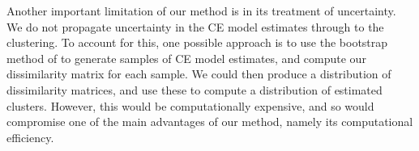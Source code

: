 \documentclass[12pt,compact]{article}
\DeclareMathOperator{\CE}{\mathrm{CE}}
\begin{document}
Another important limitation of our method is in its treatment of uncertainty.
We do not propagate uncertainty in the CE model estimates through to the clustering. 
To account for this, one possible approach is to use the bootstrap method of \citet{Heffernan2004} to generate samples of CE model estimates, and compute our dissimilarity matrix for each sample. 
We could then produce a distribution of dissimilarity matrices, and use these to compute a distribution of estimated clusters.
However, this would be computationally expensive, and so would compromise one of the main advantages of our method, namely its computational efficiency.
\end{document}
